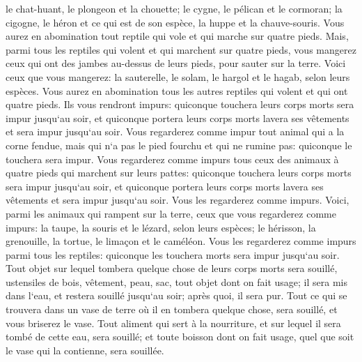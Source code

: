 \verse le chat-huant, le plongeon et la chouette; 
\verse le cygne, le pélican et le cormoran; 
\verse la cigogne, le héron et ce qui est de son espèce, la huppe et la chauve-souris. 
\verse Vous aurez en abomination tout reptile qui vole et qui marche sur quatre pieds. 
\verse Mais, parmi tous les reptiles qui volent et qui marchent sur quatre pieds, vous mangerez ceux qui ont des jambes au-dessus de leurs pieds, pour sauter sur la terre. 
\verse Voici ceux que vous mangerez: la sauterelle, le solam, le hargol et le hagab, selon leurs espèces. 
\verse Vous aurez en abomination tous les autres reptiles qui volent et qui ont quatre pieds. 
\verse Ils vous rendront impurs: quiconque touchera leurs corps morts sera impur jusqu`au soir, 
\verse et quiconque portera leurs corps morts lavera ses vêtements et sera impur jusqu`au soir. 
\verse Vous regarderez comme impur tout animal qui a la corne fendue, mais qui n`a pas le pied fourchu et qui ne rumine pas: quiconque le touchera sera impur. 
\verse Vous regarderez comme impurs tous ceux des animaux à quatre pieds qui marchent sur leurs pattes: quiconque touchera leurs corps morts sera impur jusqu`au soir, 
\verse et quiconque portera leurs corps morts lavera ses vêtements et sera impur jusqu`au soir. Vous les regarderez comme impurs. 
\verse Voici, parmi les animaux qui rampent sur la terre, ceux que vous regarderez comme impurs: la taupe, la souris et le lézard, selon leurs espèces; 
\verse le hérisson, la grenouille, la tortue, le limaçon et le caméléon. 
\verse Vous les regarderez comme impurs parmi tous les reptiles: quiconque les touchera morts sera impur jusqu`au soir. 
\verse Tout objet sur lequel tombera quelque chose de leurs corps morts sera souillé, ustensiles de bois, vêtement, peau, sac, tout objet dont on fait usage; il sera mis dans l`eau, et restera souillé jusqu`au soir; après quoi, il sera pur. 
\verse Tout ce qui se trouvera dans un vase de terre où il en tombera quelque chose, sera souillé, et vous briserez le vase. 
\verse Tout aliment qui sert à la nourriture, et sur lequel il sera tombé de cette eau, sera souillé; et toute boisson dont on fait usage, quel que soit le vase qui la contienne, sera souillée. 
